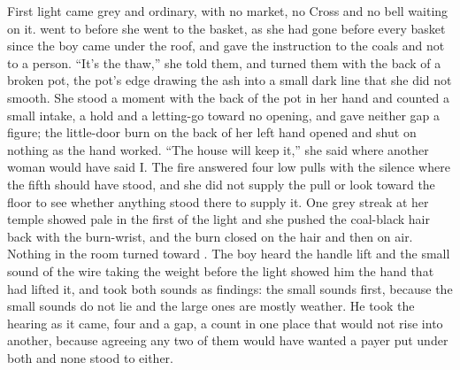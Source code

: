 First light came grey and ordinary, with no market, no Cross and no bell waiting on it.  went to  before she went to the basket, as she had gone before every basket since the boy came under the roof, and gave the instruction to the coals and not to a person. “It's the thaw,” she told them, and turned them with the back of a broken pot, the pot's edge drawing the ash into a small dark line that she did not smooth. She stood a moment with the back of the pot in her hand and counted a small intake, a hold and a letting-go toward no opening, and gave neither gap a figure; the little-door burn on the back of her left hand opened and shut on nothing as the hand worked. “The house will keep it,” she said where another woman would have said I. The fire answered four low pulls with the silence where the fifth should have stood, and she did not supply the pull or look toward the floor to see whether anything stood there to supply it. One grey streak at her temple showed pale in the first of the light and she pushed the coal-black hair back with the burn-wrist, and the burn closed on the hair and then on air. Nothing in the room turned toward . The boy heard the handle lift and the small sound of the wire taking the weight before the light showed him the hand that had lifted it, and took both sounds as findings: the small sounds first, because the small sounds do not lie and the large ones are mostly weather. He took the hearing as it came, four and a gap, a count in one place that would not rise into another, because agreeing any two of them would have wanted a payer put under both and none stood to either.


